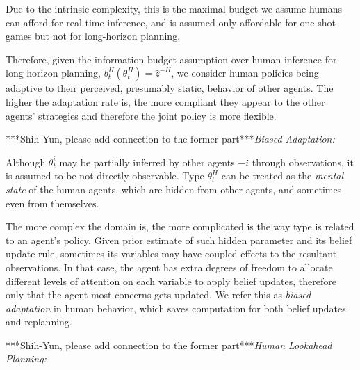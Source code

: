 \documentclass[letterpaper, 10 pt, conference]{ieeeconf}  %
\begin{document}
\begin{itemize}
    Due to the intrinsic complexity, this is the maximal budget we assume 
    humans can afford for real-time inference, and is assumed only 
    affordable for one-shot games but not for long-horizon planning. 
\end{itemize}

Therefore, given the information budget assumption over human inference for long-horizon 
planning, $b^H_t(\theta^H_t) = \hat{z}^{-H}$, we consider human policies 
being adaptive to their perceived, presumably static, behavior of other 
agents. The higher the adaptation rate is, the more compliant they 
appear to the other agents' strategies and therefore the joint policy is more flexible. 

***Shih-Yun, please add connection to the former part***\textit{Biased Adaptation:}

Although $\theta^i_t$ may be partially inferred by other agents $-i$ through 
observations, it is assumed to be not directly observable. 
Type $\theta^H_t$ can be treated as 
the \textit{mental state} of the human agents, which are 
hidden from other agents, and sometimes even from themselves.  

The more complex the domain is, the more complicated is the way type is related 
to an agent's policy. Given prior estimate of such hidden parameter and its 
belief update rule, sometimes its variables may have coupled effects to the 
resultant observations. In that case, the agent has extra degrees of freedom to 
allocate different levels of attention on 
each variable to apply belief updates, therefore only that the 
agent most concerns gets updated. We refer this as \textit{biased adaptation} in human 
behavior, which saves computation for both belief updates and replanning.  

***Shih-Yun, please add connection to the former part***\textit{Human Lookahead Planning:}
\end{document}
